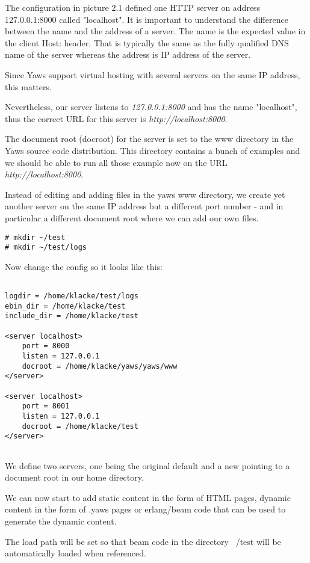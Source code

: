\documentclass[11pt,oneside,english]{book}
\begin{document}
The configuration in picture 2.1 defined one HTTP server on
address 127.0.0.1:8000 called "localhost".
It is important to understand the difference between the name and
the address of a server. The name is the expected value in the
client Host: header. That is typically the same as the fully qualified
DNS name of the server whereas the address is IP address of the server.

Since Yaws support virtual hosting with several servers on the same
IP address, this matters.

Nevertheless, our server listens to \textit{127.0.0.1:8000} and 
has the name "localhost", thus the correct URL for this server
is \textit{http://localhost:8000}.

The document root (docroot) for the server is set to the www directory in the
Yaws source code distribution. This directory contains a bunch of
examples and we should be able to run all those example now on the
URL  \textit{http://localhost:8000}.

Instead of editing and adding files in the yaws www directory, we 
create yet another server on the same IP address but a different port
number - and in particular a different document root where we can add
our own files.

\begin{verbatim}
# mkdir ~/test
# mkdir ~/test/logs
\end{verbatim}

Now change the config so it looks like this:

\begin{verbatim}

logdir = /home/klacke/test/logs
ebin_dir = /home/klacke/test
include_dir = /home/klacke/test

<server localhost>
	port = 8000
	listen = 127.0.0.1
	docroot = /home/klacke/yaws/yaws/www
</server>

<server localhost>
	port = 8001
	listen = 127.0.0.1
	docroot = /home/klacke/test
</server>


\end{verbatim}

We define two servers, one being the original default
and a new pointing to a document root in our home directory.

We can now start to add static content in the form of
HTML pages, dynamic content in the form of .yaws pages or
erlang/beam code that can be used to generate the dynamic content.

The load path will be set so that beam code in the directory ~/test
will be automatically loaded when referenced.
\end{document}
